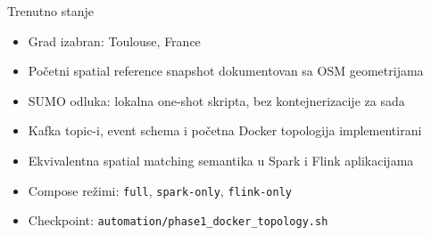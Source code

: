 \documentclass[aspectratio=169,11pt]{beamer}
\newcommand{\code}[1]{\texttt{\small #1}}
\begin{document}
\begin{frame}{Trenutno stanje}
  \begin{itemize}
    \item Grad izabran: Toulouse, France
    \item Početni spatial reference snapshot dokumentovan sa OSM geometrijama
    \item SUMO odluka: lokalna one-shot skripta, bez kontejnerizacije za sada
    \item Kafka topic-i, event schema i početna Docker topologija implementirani
    \item Ekvivalentna spatial matching semantika u Spark i Flink aplikacijama
    \item Compose režimi: \code{full}, \code{spark-only}, \code{flink-only}
    \item Checkpoint: \code{automation/phase1\_docker\_topology.sh}
  \end{itemize}
\end{frame}
\end{document}
